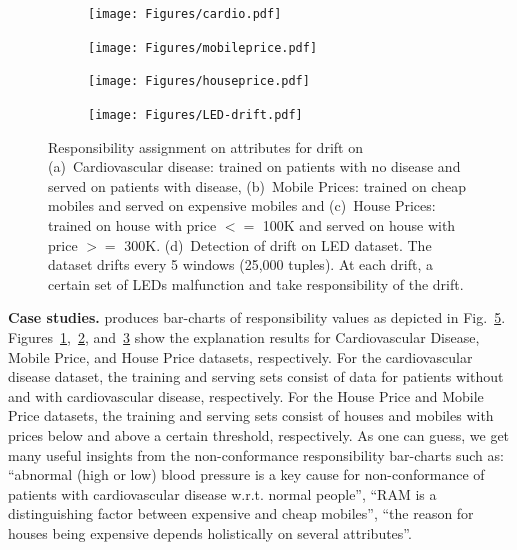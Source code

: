 {\begin{figure}
	\centering
	\begin{subfigure}{.09\textwidth}
	  \centering
	  \texttt{[image: Figures/cardio.pdf]}
	  \caption{}
	  \label{cardio}
	\end{subfigure}
	\hspace{-1mm}
	\begin{subfigure}{.09\textwidth}
	  \centering
	  \texttt{[image: Figures/mobileprice.pdf]}
	  \caption{}
	  \label{mobilePrice}
	\end{subfigure}
	\hspace{-1.5mm}
	\begin{subfigure}{.09\textwidth}
	  \centering
	  \texttt{[image: Figures/houseprice.pdf]}
	  \caption{}
	  \label{housePrice}
	\end{subfigure}
	\hspace{-1.5mm}
	\begin{subfigure}{.2\textwidth}
		\centering
		\texttt{[image: Figures/LED-drift.pdf]}
	  	\caption{}
	    \label{fig:LED-drift}
	\end{subfigure}
	\vspace{-3mm}
	\caption{Responsibility assignment on attributes for drift on 
	(a)~Cardiovascular disease: trained on patients with no disease and served on patients with disease,
	(b)~Mobile Prices: trained on cheap mobiles and served on expensive mobiles and 
	(c)~House Prices: trained on house with price $<=$ 100K and served on house with price $>=$ 300K.
	(d)~Detection of drift on LED dataset. The dataset drifts every 5
		 windows (25,000 tuples). At each drift, a certain set of LEDs
		 malfunction and take responsibility of the drift.}
	\label{fig:extune}
	\vspace{-7mm}
\end{figure}

\begin{figure}
	\centering


\end{figure}

\smallskip

\noindent\textbf{Case studies.} \extune produces bar-charts of responsibility
values as depicted in Fig.~\ref{fig:extune}.
Figures~\ref{cardio},~\ref{mobilePrice}, and~\ref{housePrice} show the
explanation results for Cardiovascular Disease, Mobile Price, and House Price
datasets, respectively. For the cardiovascular disease dataset, the training
and serving sets consist of data for patients without and with cardiovascular
disease, respectively. For the House Price and Mobile Price datasets, the
training and serving sets consist of houses and mobiles with prices below and
above a certain threshold, respectively. As one can guess, we get many useful
insights from the non-conformance responsibility bar-charts such as: ``abnormal
(high or low) blood pressure is a key cause for non-conformance of patients
with cardiovascular disease w.r.t. normal people'', ``RAM is a distinguishing
factor between expensive and cheap mobiles'', ``the reason for houses being
expensive depends holistically on several attributes''.

}
